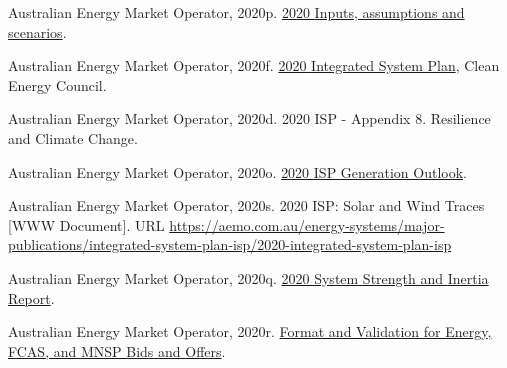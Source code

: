 \documentclass[12pt,a4paper,]{report}
\newlength{\cslhangindent}
\newenvironment{CSLReferences}[2] %
 {%
  \setlength{\parindent}{0pt}
  \ifodd #1 \everypar{\setlength{\hangindent}{\cslhangindent}}\ignorespaces\fi
  \ifnum #2 > 0
  \setlength{\parskip}{#2\baselineskip}
  \fi
 }%
 {}
\begin{document}
\begin{CSLReferences}{1}{0}
\leavevmode{}%
Australian Energy Market Operator, 2020p.
\href{https://aemo.com.au/-/media/files/electricity/nem/planning_and_forecasting/inputs-assumptions-methodologies/2020/2020-inputs-and-assumptions-workbook-dec20.xlsx?la=en}{2020
{Inputs}, assumptions and scenarios}.

\leavevmode{}%
Australian Energy Market Operator, 2020f.
\href{https://aemo.com.au/energy-systems/major-publications/integrated-system-plan-isp/2020-integrated-system-plan-isp}{2020
{Integrated System Plan}}, Clean Energy Council.

\leavevmode{}%
Australian Energy Market Operator, 2020d. 2020 {ISP} - {Appendix} 8.
{Resilience} and {Climate Change}.

\leavevmode{}%
Australian Energy Market Operator, 2020o.
\href{https://aemo.com.au/-/media/files/major-publications/isp/2020/final-2020-isp-generation-outlook.zip?la=en}{2020
{ISP Generation Outlook}}.

\leavevmode{}%
Australian Energy Market Operator, 2020s. 2020 {ISP}: {Solar} and {Wind
Traces} {[}WWW Document{]}. URL
\url{https://aemo.com.au/energy-systems/major-publications/integrated-system-plan-isp/2020-integrated-system-plan-isp}

\leavevmode{}%
Australian Energy Market Operator, 2020q.
\href{https://www.aemo.com.au/-/media/files/electricity/nem/planning_and_forecasting/Operability/2020/2020-System-Strength-and-Inertia-Report\#:~:text=previously\%20declared\%20system\%20strength\%20and\%20inertia\%20shortfalls&text=The\%20inertia\%20requirements\%20include\%20the,when\%20a\%20reg}{2020
{System Strength} and {Inertia Report}}.

\leavevmode{}%
Australian Energy Market Operator, 2020r.
\href{https://www.aemo.com.au/-/media/Files/Electricity/NEM/5MS/Systems-Workstream/2019/Format-and-Validation-for-Energy-FCAS-and-MNSP-Bids-and-Offers.pdf}{Format
and {Validation} for {Energy}, {FCAS}, and {MNSP Bids} and {Offers}}.


\end{CSLReferences}
\end{document}
